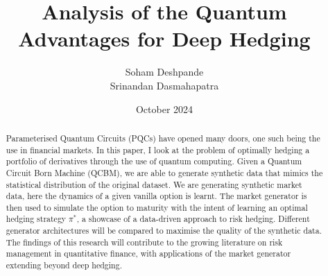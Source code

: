 \documentclass[12pt]{article}
\title{Analysis of the Quantum Advantages for Deep Hedging}
\author{Soham Deshpande\\ Srinandan Dasmahapatra}
\date{October 2024}
\numberwithin{equation}{section}
\begin{document}
\maketitle
\thispagestyle{empty}
\clearpage


\clearpage



\begin{abstract}
Parameterised Quantum Circuits (PQCs) have opened many doors, one 
such being the use in financial markets. In this paper, I look at the problem 
of optimally hedging a portfolio of derivatives through the use of quantum computing. 
Given a Quantum Circuit Born Machine (QCBM), we are able to generate synthetic 
data that mimics the statistical distribution of the original dataset. 
We are generating synthetic market data, here the dynamics of a 
given vanilla option is learnt. The market generator is then used to simulate the 
option to maturity with the intent of learning an optimal hedging strategy $\pi^*$, a 
showcase of a data-driven approach to risk hedging. Different generator architectures
will be compared to maximise the quality of the synthetic data. The findings of 
this research will contribute to the growing literature on risk management in 
quantitative finance, with applications of the market generator extending beyond 
deep hedging. 
\end{abstract}
\clearpage

\tableofcontents
\clearpage



\end{document}
